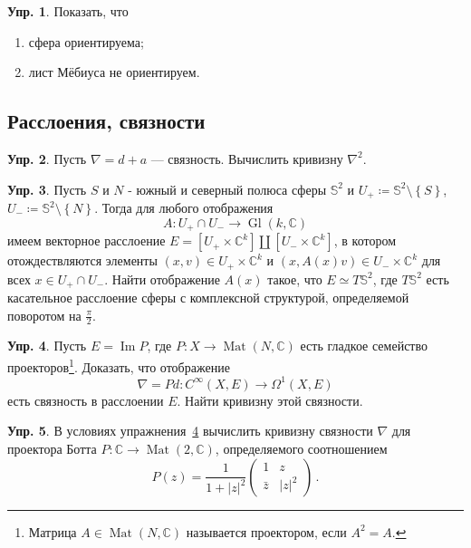 \documentclass[a4paper, 12pt]{article}
\theoremstyle{definition}
\newtheorem{exercise}{Упр.}
\begin{document}
\begin{exercise}
    Показать, что
    \begin{enumerate}
        \item сфера ориентируема;
        \item лист Мёбиуса не ориентируем.
    \end{enumerate}
\end{exercise}

\subsection{Расслоения, связности}

\begin{exercise}
    Пусть \({ \nabla = d + a }\) --- связность. Вычислить кривизну \({ \nabla^2 }\).
\end{exercise}

\begin{exercise}
    Пусть \({ S }\) и \({ N }\) - южный и северный полюса сферы \({ \mathbb S^2 }\) и \({ U_{+} \coloneqq \mathbb S^2 \setminus \left\{ S \right\} }\), \({ U_{-} \coloneqq \mathbb S^2 \setminus \left\{ N \right\} }\). Тогда для любого отображения \[
        A : U_+ \cap U_- \to \operatorname{Gl}(k, \mathbb C)
    \]
    имеем векторное расслоение \({ E = \left[ U_+ \times \mathbb C^{k} \right] \amalg \left[ U_- \times \mathbb C^{k} \right] }\), в котором отождествляются элементы \({ (x, v) \in U_+ \times \mathbb C^{k} }\) и \({ (x, A(x)v) \in U_- \times \mathbb C^{k} }\) для всех \({ x \in U_+ \cap U_- }\). Найти отображение \({ A(x) }\) такое, что \({ E \simeq T \mathbb S^2 }\), где \({ T\mathbb S^2 }\) есть касательное расслоение сферы с комплексной структурой, определяемой поворотом на \({ \frac{\pi}{2} }\).
\end{exercise}

\begin{exercise}
    \label{ex:connection_induced_by_projections}
    Пусть \({ E = \operatorname{Im} P }\), где \({ P : X \to \operatorname{Mat}(N, \mathbb C) }\) есть гладкое семейство проекторов\footnote{Матрица \({ A \in \operatorname{Mat}(N, \mathbb C) }\) называется проектором, если \({ A^2 = A }\).}. Доказать, что отображение \[
        \nabla = Pd : C^{\infty}(X, E) \to \Omega^{1}(X, E)
    \] есть связность в расслоении \({ E }\). Найти кривизну этой связности.
\end{exercise}

\begin{exercise}
    В условиях упражнения~\ref{ex:connection_induced_by_projections} вычислить кривизну связности \({ \nabla }\) для проектора Ботта \({ P : \mathbb C \to \operatorname{Mat}(2, \mathbb C) }\), определяемого соотношением \[
        P(z) = \frac{1}{1 + \lvert z \rvert^2} \begin{pmatrix}
            1 & z \\
            \bar z & \lvert z \rvert^2
        \end{pmatrix}\,.
    \] 
\end{exercise}
\end{document}
